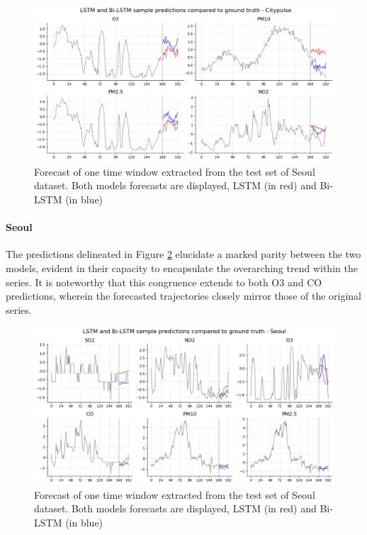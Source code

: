 \begin{figure}[h]
    \centering
    \includegraphics[width=1\linewidth]{images/Results/forecasts_aarhus.png}
    \caption{Forecast of one time window extracted from the test set of Seoul dataset. Both models forecasts are displayed, LSTM (in red) and Bi-LSTM (in blue)}
    \label{fig:forecasts_aarhus}
\end{figure}

\paragraph{Seoul}

The predictions delineated in Figure \ref{fig:forecasts_seoul} elucidate a marked parity between the two models, evident in their capacity to encapsulate the overarching trend within the series. It is noteworthy that this congruence extends to both O3 and CO predictions, wherein the forecasted trajectories closely mirror those of the original series.

\begin{figure}[h]
    \centering
    \includegraphics[width=1\linewidth]{images/Results/forecasts_seoul.png}
    \caption{Forecast of one time window extracted from the test set of Seoul dataset. Both models forecasts are displayed, LSTM (in red) and Bi-LSTM (in blue)}
    \label{fig:forecasts_seoul}
\end{figure}

